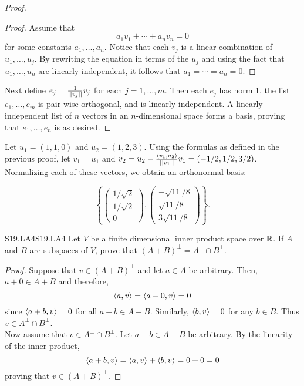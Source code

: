 \documentclass[../AlgebraQualSolutions.tex]{subfiles}
\begin{document}
\begin{proof}
\begin{claim}
            \begin{proof}
                Assume that
                \[a_1v_1 + \cdots + a_nv_n = 0\]
                for some constants $a_1,\ldots, a_n$. Notice that each $v_j$ is a linear combination of $u_1,\ldots, u_j$. By rewriting the equation in terms of the $u_j$ and using the fact that $u_1,\ldots, u_n$ are linearly independent, it follows  that $a_1 = \cdots = a_n = 0$.
            \end{proof}
        \end{claim}

    Next define $e_j = \frac{1}{\norm[v_j]}v_j$ for each $j = 1,\ldots, m$. Then each $e_j$ has norm 1, the list $e_1,\ldots, e_m$ is pair-wise orthogonal, and is linearly independent. A linearly independent list of $n$ vectors in an $n$-dimensional space forms a basis, proving that $e_1,\ldots, e_n$ is as desired.
\end{proof}

\begin{solution}
    Let $u_1 = (1,1,0)$ and $u_2 = (1,2,3)$. Using the formulas as defined in the previous proof, let $v_1 = u_1$ and $v_2 = u_2 - \frac{\ip{v_1}{u_2}}{\norm[v_1]}v_1 = (-1/2,1/2,3/2)$. Normalizing each of these vectors, we obtain an orthonormal basis:

        \[\left\{ \begin{pmatrix} 1/\sqrt2\\ 1/\sqrt 2\\ 0 \end{pmatrix}, \begin{pmatrix}-\sqrt{11}/8 \\ \sqrt{11}/8\\ 3\sqrt{11}/8 \end{pmatrix} \right\}.\]
\end{solution}

\begin{prob}{S19.LA4}{S19.LA4}
    Let $V$ be a finite dimensional inner product space over $\R$. If $A$ and $B$ are subspaces of $V$, prove that $(A+B)^\perp = A^\perp \cap B^\perp$.
\end{prob}

\begin{proof}
    Suppose that $v \in (A+B)^\perp$ and let $a \in A$ be arbitrary. Then, $a + 0 \in A+B$ and therefore,
        \[\ip{a}{v} = \ip{a+0}{v} = 0\]
    since $\ip{a + b}{v} = 0$ for all $a + b \in A + B$. Similarly, $\ip{b}{v} = 0$ for any $b \in B$. Thus $v \in A^\perp \cap B^\perp$.\\

    Now assume that $v \in A^\perp \cap B^\perp$. Let $a + b \in A + B$ be arbitrary. By the linearity of the inner product,
        \[\ip{a + b}{v} = \ip{a}{v} + \ip{b}{v} = 0 + 0 = 0\]
    proving that $v \in (A+B)^\perp$.
\end{proof}
\end{document}
